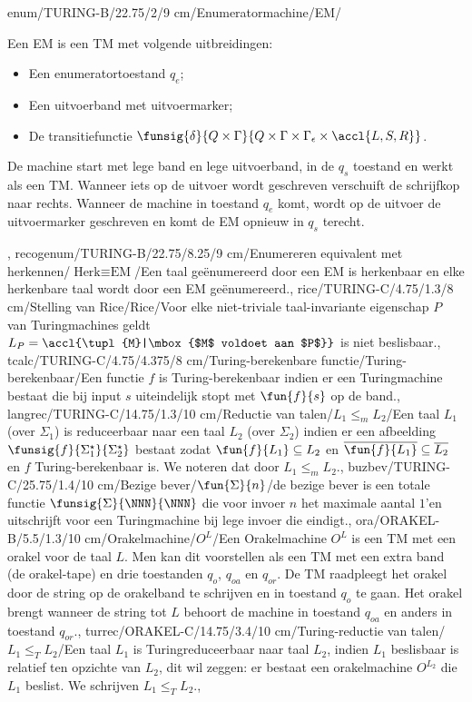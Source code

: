 enum/TURING-B/22.75/2/9 cm/Enumeratormachine/EM/{Een EM is een TM met volgende uitbreidingen:\begin{itemize}\item Een enumeratortoestand $q_e$;\item Een uitvoerband met uitvoermarker;\item De transitiefunctie $\funsig{\delta}{Q\times\Gamma}{Q\times\Gamma\times\Gamma_{\epsilon}\times\accl{L,S,R}}$.\end{itemize}De machine start met lege band en lege uitvoerband, in de $q_s$ toestand en werkt als een TM. Wanneer iets op de uitvoer wordt geschreven verschuift de schrijfkop naar rechts. Wanneer de machine in toestand $q_e$ komt, wordt op de uitvoer de uitvoermarker geschreven en komt de EM opnieuw in $q_s$ terecht.},
recogenum/TURING-B/22.75/8.25/9 cm/Enumereren equivalent met herkennen/$\mbox{Herk}\equiv\mbox{EM}$/{Een taal ge\"enumereerd door een EM is herkenbaar en elke herkenbare taal wordt door een EM ge\"enumereerd.},
rice/TURING-C/4.75/1.3/8 cm/Stelling van Rice/Rice/{Voor elke niet-triviale taal-invariante eigenschap $P$ van Turingmachines geldt $L_{P}=\accl{\tupl{M}|\mbox{$M$ voldoet aan $P$}}$ is niet beslisbaar.},
tcalc/TURING-C/4.75/4.375/8 cm/Turing-berekenbare functie/Turing-berekenbaar/{Een functie $f$ is Turing-berekenbaar indien er een Turingmachine bestaat die bij input $s$ uiteindelijk stopt met $\fun{f}{s}$ op de band.},
langrec/TURING-C/14.75/1.3/10 cm/Reductie van talen/$L_1\leq_mL_2$/{Een taal $L_1$ (over $\Sigma_1$) is reduceerbaar naar een taal $L_2$ (over $\Sigma_2$) indien er een afbeelding $\funsig{f}{\Sigma_1^{\star}}{\Sigma_2^{\star}}$ bestaat zodat $\fun{f}{L_1}\subseteq L_2$ en $\overline{\fun{f}{L_1}}\subseteq\overline{L_2}$ en $f$ Turing-berekenbaar is. We noteren dat door $L_1\leq_mL_2$.},
buzbev/TURING-C/25.75/1.4/10 cm/Bezige bever/$\fun{\Sigma}{n}$/{de bezige bever is een totale functie $\funsig{\Sigma}{\NNN}{\NNN}$ die voor invoer $n$ het maximale aantal $1$'en uitschrijft voor een Turingmachine bij lege invoer die eindigt.},
ora/ORAKEL-B/5.5/1.3/10 cm/Orakelmachine/$O^L$/{Een Orakelmachine $O^L$ is een TM met een orakel voor de taal $L$. Men kan dit voorstellen als een TM met een extra band (de orakel-tape) en drie toestanden $q_o$, $q_{oa}$ en $q_{or}$. De TM raadpleegt het orakel door de string op de orakelband te schrijven en in toestand $q_o$ te gaan. Het orakel brengt wanneer de string tot $L$ behoort de machine in toestand $q_{oa}$ en anders in toestand $q_{or}$.},
turrec/ORAKEL-C/14.75/3.4/10 cm/Turing-reductie van talen/$L_1\leq_TL_2$/{Een taal $L_1$ is Turingreduceerbaar naar taal $L_2$, indien $L_1$ beslisbaar is relatief ten opzichte van $L_2$, dit wil zeggen: er bestaat een orakelmachine $O^{L_2}$ die $L_1$ beslist. We schrijven $L_1\leq_TL_2$.},
